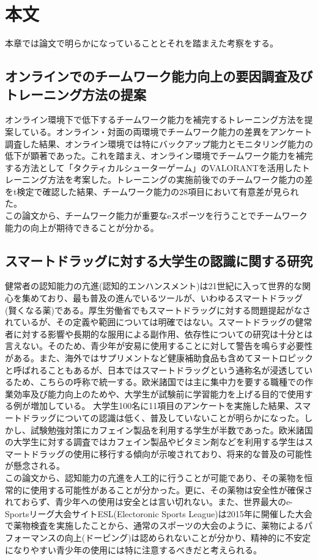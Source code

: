 \section{本文}
本章では論文で明らかになっていることとそれを踏まえた考察をする。
\subsection{オンラインでのチームワーク能力向上の要因調査及びトレーニング方法の提案}
オンライン環境下で低下するチームワーク能力を補完するトレーニング方法を提案している。オンライン・対面の両環境でチームワーク能力の差異をアンケート調査した結果、オンライン環境では特にバックアップ能力とモニタリング能力の低下が顕著であった。これを踏まえ、オンライン環境でチームワーク能力を補完する方法として「タクティカルシューターゲーム」のVALORANTを活用したトレーニング方法を考案した。トレーニングの実施前後でのチームワーク能力の差をt検定で確認した結果、チームワーク能力の28項目において有意差が見られた。\cite{Fukuyasu2020}\\
この論文から、チームワーク能力が重要なeスポーツを行うことでチームワーク能力の向上が期待できることが分かる。
\subsection{スマートドラッグに対する大学生の認識に関する研究}
健常者の認知能力の亢進(認知的エンハンスメント)は21世紀に入って世界的な関心を集めており、最も普及の進んでいるツールが、いわゆるスマートドラッグ(賢くなる薬)である。厚生労働省でもスマートドラッグに対する問題提起がなされているが、その定義や範囲については明確ではない。スマートドラッグの健常者に対する影響や長期的な服用による副作用、依存性についての研究は十分とは言えない。そのため、青少年が安易に使用することに対して警告を鳴らす必要性がある。また、海外ではサプリメントなど健康補助食品も含めてヌートロピックと呼ばれることもあるが、日本ではスマートドラッグという通称名が浸透しているため、こちらの呼称で統一する。欧米諸国では主に集中力を要する職種での作業効率及び能力向上のためや、大学生が試験前に学習能力を上げる目的で使用する例が増加している。
大学生100名に11項目のアンケートを実施した結果、スマートドラッグについての認識は低く、普及していないことが明らかになった。しかし、試験勉強対策にカフェイン製品を利用する学生が半数であった。欧米諸国の大学生に対する調査ではカフェイン製品やビタミン剤などを利用する学生はスマートドラッグの使用に移行する傾向が示唆されており、将来的な普及の可能性が懸念される。\cite{published_papers/16690353}\\
この論文から、認知能力の亢進を人工的に行うことが可能であり、その薬物を恒常的に使用する可能性があることが分かった。更に、その薬物は安全性が確保されておらず、青少年への使用は安全とは言い切れない。また、世界最大のe-Sportsリーグ大会サイトESL(Electoronic Sports League)は2015年に開催した大会で薬物検査を実施したことから、通常のスポーツの大会のように、薬物によるパフォーマンスの向上(ドーピング)は認められないことが分かり、精神的に不安定になりやすい青少年の使用には特に注意するべきだと考えられる。
